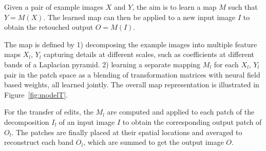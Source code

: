 Given a pair of example images $X$ and $Y$, the aim is to learn a map $M$ such that $Y = M(X)$. The learned map can then be applied to a new input image $I$ to obtain the retouched output $O = M(I)$. 

The map is defined by 1) decomposing the example images into multiple feature maps $X_l$, $Y_l$ capturing details at different scales, such as coefficients at different bands of a Laplacian pyramid. 2) learning a separate mapping $M_l$ for each $X_l$, $Y_l$ pair in the patch space as a blending of transformation matrices with neural field based weights, all learned jointly. The overall map representation is illustrated in Figure~\ref{fig:modelT}.

For the transfer of edits, the $M_l$ are computed and applied to each patch of the decomposition $I_l$ of an input image $I$ to obtain the corresponding output patch of $O_l$. The patches are finally placed at their spatial locations and averaged to reconstruct each band $O_l$, which are summed to get the output image $O$.

